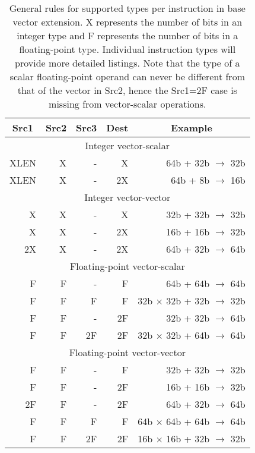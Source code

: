 \begin{table}
  \centering
  \begin{tabular}{|r|r|r|r|r|}
    \hline
    \multicolumn{1}{|c|}{Src1} &
    \multicolumn{1}{c|}{Src2} &
    \multicolumn{1}{c|}{Src3} &
    \multicolumn{1}{c|}{Dest} &
    \multicolumn{1}{c|}{Example} \\
    \hline
    \hline
    \multicolumn{5}{|c|}{Integer vector-scalar}\\
    \hline
    XLEN &   X & - &  X & 64b + 32b $\rightarrow$ 32b \\
    XLEN &   X & - & 2X & 64b + 8b  $\rightarrow$ 16b \\
    \hline
    \hline
    \multicolumn{5}{|c|}{Integer vector-vector}\\
    \hline
      X &  X & - &   X & 32b + 32b $\rightarrow$ 32b \\
      X &  X & - &  2X & 16b + 16b $\rightarrow$ 32b \\
     2X &  X & - &  2X & 64b + 32b $\rightarrow$ 64b \\
    \hline
    \hline
    \multicolumn{5}{|c|}{Floating-point vector-scalar}\\
    \hline
     F &  F & -  &  F &  64b + 64b $\rightarrow$ 64b \\
     F &  F & F  &  F &  32b $\times$ 32b + 32b $\rightarrow$ 32b \\
     F &  F & -  & 2F &  32b + 32b $\rightarrow$ 64b \\
     F &  F & 2F & 2F &  32b $\times$ 32b + 64b $\rightarrow$ 64b \\
    \hline
    \hline
    \multicolumn{5}{|c|}{Floating-point vector-vector}\\
    \hline
      F &  F  & - &   F & 32b + 32b $\rightarrow$ 32b \\
      F &  F  & - &  2F & 16b + 16b $\rightarrow$ 32b \\
     2F &  F  & - &  2F & 64b + 32b $\rightarrow$ 64b \\
      F &  F & F  &  F &  64b $\times$ 64b + 64b $\rightarrow$ 64b \\
      F &  F & 2F & 2F &  16b $\times$ 16b + 32b $\rightarrow$ 32b \\
    \hline
  \end{tabular}
  \caption{General rules for supported types per instruction in base
    vector extension.  X represents the number of bits in an integer
    type and F represents the number of bits in a floating-point type.
    Individual instruction types will provide more detailed listings.
    Note that the type of a scalar floating-point operand can never be
    different from that of the vector in Src2, hence the Src1=2F case
    is missing from vector-scalar operations.}
  \label{tab:vtypemix}
\end{table}

